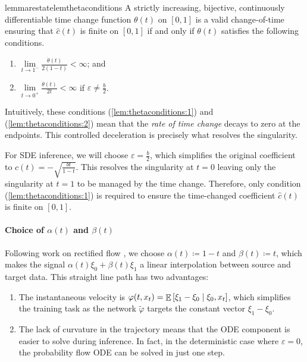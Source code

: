 \begin{theorembox}
  \begin{restatable}{lemma}{restatelemthetaconditions}\label{lem:thetaconditions}
    A strictly increasing, bijective, continuously differentiable time change function \(\theta(t)\) on \([0, 1]\) is a valid change-of-time ensuring that \(\hat{c}(t)\) is finite on \([0, 1]\) if and only if \(\theta(t)\) satisfies the following conditions.
    \begin{enumerate}
      \item\label{lem:thetaconditions:1} \(\lim\limits_{t \to 1^{-}} \frac{\dot{\theta}(t)}{2(1-t)} < \infty \); and
      \item\label{lem:thetaconditions:2} \(\lim\limits_{t \to 0^{+}} \frac{\dot{\theta}(t)}{2t} < \infty \) if \(\varepsilon \neq \frac{b}{2}\).
    \end{enumerate}
  \end{restatable}
\end{theorembox}
\begin{remarkbox}
  \begin{remark}
    Intuitively, these conditions (\ref{lem:thetaconditions:1}) and (\ref{lem:thetaconditions:2}) mean that the \textit{rate of time change} decays to zero at the endpoints. This controlled deceleration is precisely what resolves the singularity.
  \end{remark}
\end{remarkbox}
For SDE inference, we will choose \(\varepsilon = \frac{b}{2}\), which simplifies the original coefficient to \(c(t) = -\sqrt{\frac{bt}{1-t}}\). This resolves the singularity at \(t=0\) leaving only the singularity at  \(t=1\) to be  managed by the time change. Therefore, only condition (\ref{lem:thetaconditions:1}) is required to ensure the time-changed coefficient \(\hat{c}(t)\) is finite on \([0, 1]\).

\paragraph{Choice of \(\alpha(t)\) and \(\beta(t)\)}
Following work on rectified flow \citep{liu2022flow}, we choose \(\alpha(t)  \coloneqq 1-t\) and \(\beta(t) \coloneqq t\), which makes the signal \(\alpha(t) \xi_{0} + \beta(t) \xi_{1}\) a linear interpolation between source and target data. This straight line path has two advantages:
\begin{enumerate}
  \item The instantaneous velocity is \(\varphi(t, x_{t}) = \mathop{\mathbb{E}}\qty[\xi_{1} - \xi_{0} \mid \xi_{0}, x_{t}]\), which simplifies the training task as the network \(\widetilde{\varphi}\) targets the constant vector \(\xi_{1} - \xi_{0}\).
  \item The lack of curvature in the trajectory means that the ODE component is easier to solve during inference. In fact, in the deterministic case where \(\varepsilon = 0\), the probability flow ODE can be solved in just one step.
\end{enumerate}


